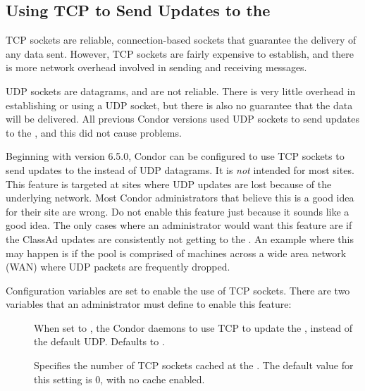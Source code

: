 \subsection{\label{sec:tcp-collector-update}
Using TCP to Send Updates to the }


TCP sockets are reliable, connection-based sockets that guarantee
the delivery of any data sent.
However, TCP sockets are fairly expensive to establish, and there is more
network overhead involved in sending and receiving messages.

UDP sockets are datagrams, and are not reliable.
There is very little overhead in establishing or using a UDP socket,
but there is also no guarantee that the data will be delivered.
All previous Condor versions used UDP sockets to send updates to
the , and this did not cause problems.

Beginning with version 6.5.0, Condor can be configured to use TCP
sockets to send updates to the  instead of
UDP datagrams.
It is \emph{not} intended for most sites.
This feature is targeted at sites where UDP updates are
lost because of the underlying network.
Most Condor administrators that believe this is a good idea for
their site are wrong.
Do not enable this feature just because it sounds like a good idea.
The only cases where an administrator would want this feature are if
the ClassAd updates are consistently not getting to the
.
An example where this may happen is if the pool is comprised of
machines across a wide area network (WAN) where UDP packets are
frequently dropped.

Configuration variables are set to enable the use of TCP sockets.
There are two variables that an
administrator must define to enable this feature:

\begin{description}

\item[]
  When set to , the Condor daemons to use TCP to
  update the , instead of the default UDP.
  Defaults to .

\item[] 
  Specifies the number of TCP sockets cached at the .
  The default value for this setting is 0, with no cache enabled.

\end{description}


